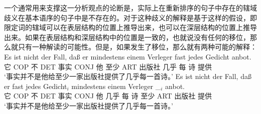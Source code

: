 %
一个通常用来支撑这一分析观点的论断是，实际上在重新排序的句子中存在的辖域歧义在基本语序的句子中是不存在的。对于这种歧义的解释是基于这样的假设，即限定词的辖域可以在表层结构的位置上推导出来，也可以在深层结构的位置上推导出来。如果在表层结构和深层结构中的位置是一致的，也就说没有任何的移位，那么就只有一种解读的可能性。但是，如果发生了移位，那么就有两种可能的解释\citep[\page ]{Frey93a}：
\eal
\ex 
\gll Es ist nicht der Fall, daß er mindestens einem Verleger fast jedes Gedicht anbot.\\
     它 COP 不 DET 事实 CONJ 他 至少 ART 出版社 几乎 每 诗 提供\\
\glt `事实并不是他给至少一家出版社提供了几乎每一首诗。'
\ex 
\gll Es ist nicht der Fall, daß er fast jedes Gedicht$_i$ mindestens einem Verleger \_$_i$ anbot.\\
	 它 COP 不 DET 事实 CONJ 他 几乎 每 诗 至少 ART 出版社 {} 提供\\
\glt `事实并不是他给至少一家出版社提供了几乎每一首诗。'
\zl

